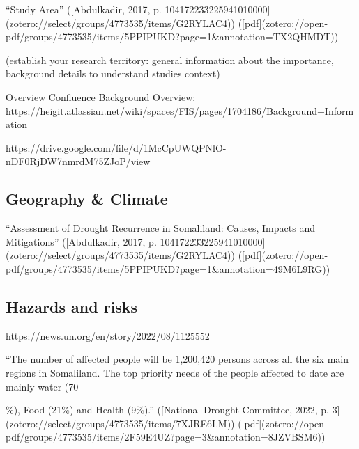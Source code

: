 {%
“Study Area” ([Abdulkadir, 2017, p. 104172233225941010000](zotero://select/groups/4773535/items/G2RYLAC4)) ([pdf](zotero://open-pdf/groups/4773535/items/5PPIPUKD?page=1&annotation=TX2QHMDT))


(establish your research territory: general information about the importance, background details to understand studies context)

Overview Confluence Background Overview:
https://heigit.atlassian.net/wiki/spaces/FIS/pages/1704186/Background+Information

https://drive.google.com/file/d/1McCpUWQPNlO-nDF0RjDW7nmrdM75ZJoP/view
\subsection{Geography & Climate}

“Assessment of Drought Recurrence in Somaliland: Causes, Impacts and Mitigations” ([Abdulkadir, 2017, p. 104172233225941010000](zotero://select/groups/4773535/items/G2RYLAC4)) ([pdf](zotero://open-pdf/groups/4773535/items/5PPIPUKD?page=1&annotation=49M6L9RG))

\subsection{Hazards and risks}

https://news.un.org/en/story/2022/08/1125552

“The number of affected people will be 1,200,420 persons across all the six main regions in Somaliland. The top priority needs of the people affected to date are mainly water (70{\%), Food (21\%) and Health (9\%).” ([National Drought Committee, 2022, p. 3](zotero://select/groups/4773535/items/7XJRE6LM)) ([pdf](zotero://open-pdf/groups/4773535/items/2F59E4UZ?page=3&annotation=8JZVBSM6))


}}
